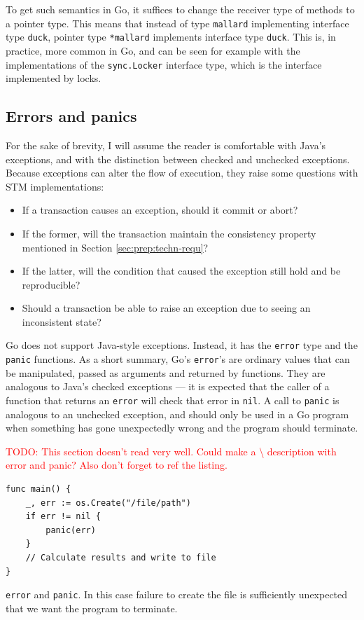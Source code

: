 \documentclass[12pt,a4paper,oneside,openright]{report}
\newcommand{\mycaption}[2]{\caption[#1]{#1 #2}}
\newcommand{\todo}[1]{\textcolor{red}{TODO: #1}}
\newcommand{\goType}[1]{\texttt{#1}}
\newcommand{\goValue}[1]{\texttt{#1}}
\newcommand{\goFunc}[1]{\texttt{#1}}
\begin{document}
To get such semantics in Go, it suffices to change the receiver type
of methods to a pointer type. This means that instead of type
\goType{mallard} implementing interface type \goType{duck}, pointer
type \goType{*mallard} implements interface type \goType{duck}. This
is, in practice, more common in Go, and can be seen for example with
the implementations of the \goType{sync.Locker} interface type, which
is the interface implemented by locks.

\subsection{Errors and panics}
\label{sec:prep:panics-errors}

For the sake of brevity, I will assume the reader is comfortable with
Java's exceptions, and with the distinction between checked and
unchecked exceptions. Because exceptions can alter the flow of
execution, they raise some questions with STM implementations:

\begin{itemize}
\item If a transaction causes an exception, should it commit or abort?
\item If the former, will the transaction maintain the consistency
  property mentioned in Section \ref{sec:prep:techn-requ}?
\item If the latter, will the condition that caused the exception
  still hold and be reproducible?
\item Should a transaction be able to raise an exception due to seeing
  an inconsistent state?
\end{itemize}

Go does not support Java-style exceptions. Instead, it has the
\goType{error} type and the \goFunc{panic} functions. As a short
summary, Go's \goType{error}'s are ordinary values that can be
manipulated, passed as arguments and returned by functions. They are
analogous to Java's checked exceptions --- it is expected that the
caller of a function that returns an \goType{error} will check that
error in \goValue{nil}. A call to \goFunc{panic} is analogous to an
unchecked exception, and should only be used in a Go program when
something has gone unexpectedly wrong and the program should
terminate.

\todo{This section doesn't read very well. Could make a \textbackslash
  description with error and panic? Also don't forget to ref the
  listing.}

\begin{Listing}[hbtp]
\begin{lstlisting}
func main() {
    _, err := os.Create("/file/path")
    if err != nil {
        panic(err)
    }
    // Calculate results and write to file
}
\end{lstlisting}

  \mycaption{\goType{error} and \goFunc{panic}.}{In this case failure
    to create the file is sufficiently unexpected that we want the
    program to terminate.}
  \label{lst:errorPanic}
\end{Listing}
\end{document}
